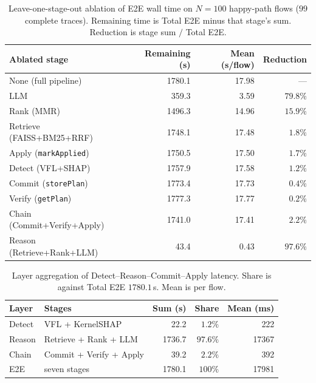 \documentclass[10pt, conference]{IEEEtran}
\begin{document}
\begin{table}[t]
\centering
\caption{Leave-one-stage-out ablation of E2E wall time on $N{=}100$ happy-path flows ($99$ complete traces). Remaining time is Total E2E minus that stage's sum. Reduction is stage sum $/$ Total E2E.}
\label{tab:e2e-ablation}
\renewcommand{\arraystretch}{1.12}
\setlength{\tabcolsep}{4pt}
{\footnotesize
\begin{tabular}{@{}lrrr@{}}
\toprule
\textbf{Ablated stage} & \textbf{Remaining (s)} & \textbf{Mean (s/flow)} & \textbf{Reduction}\\
\midrule
None (full pipeline) & 1780.1 & 17.98 & --- \\
LLM & 359.3 & 3.59 & $79.8\%$ \\
Rank (MMR) & 1496.3 & 14.96 & $15.9\%$ \\
Retrieve (FAISS+BM25+RRF) & 1748.1 & 17.48 & $1.8\%$ \\
Apply (\texttt{markApplied}) & 1750.5 & 17.50 & $1.7\%$ \\
Detect (VFL+SHAP) & 1757.9 & 17.58 & $1.2\%$ \\
Commit (\texttt{storePlan}) & 1773.4 & 17.73 & $0.4\%$ \\
Verify (\texttt{getPlan}) & 1777.3 & 17.77 & $0.2\%$ \\
Chain (Commit+Verify+Apply) & 1741.0 & 17.41 & $2.2\%$ \\
Reason (Retrieve+Rank+LLM) & 43.4 & 0.43 & $97.6\%$ \\
\bottomrule
\end{tabular}}
\end{table}

\begin{table}[t]
\centering
\caption{Layer aggregation of Detect--Reason--Commit--Apply latency. Share is against Total E2E $1780.1$\,s. Mean is per flow.}
\label{tab:e2e-layers}
\renewcommand{\arraystretch}{1.12}
\begin{tabular}{@{}llrrr@{}}
\toprule
\textbf{Layer} & \textbf{Stages} & \textbf{Sum (s)} & \textbf{Share} & \textbf{Mean (ms)}\\
\midrule
Detect & VFL + KernelSHAP & 22.2 & $1.2\%$ & 222 \\
Reason & Retrieve + Rank + LLM & 1736.7 & $97.6\%$ & 17367 \\
Chain & Commit + Verify + Apply & 39.2 & $2.2\%$ & 392 \\
E2E & seven stages & 1780.1 & $100\%$ & 17981 \\
\bottomrule
\end{tabular}
\end{table}
\end{document}
